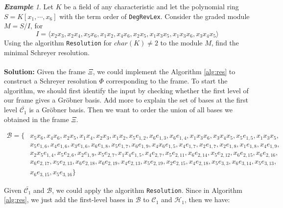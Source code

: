\documentclass{article}
\theoremstyle{definition}
\theoremstyle{remark}
\theoremstyle{example}
\newtheorem{example}{\textbf{Example}}[section]
\begin{document}
\begin{example}
    Let $K$ be a field of any characteristic and let the polynomial ring $S = K[x_1,\cdots,x_6]$ with the term order of \verb+DegRevLex+. Consider the graded module $M = S/I$, for 
    \begin{equation}
        I = \langle x_2x_3,x_2x_4,x_5x_6,x_1x_2,x_4x_6,x_2x_5,x_1x_3x_5,x_1x_3x_6,x_3x_4x_5\rangle
    \end{equation} 
    Using the algorithm \verb+Resolution+ for $char(K) \neq 2$ to the module $M$, find the minimal Schreyer resolution.
\end{example}

\paragraph{}

\textbf{Solution: }Given the frame $\Xi$, we could implement the Algorithm \ref{alg:res} to construct a Schreyer resolution $\Phi$ corresponding to the frame. To start the algorithm, we should first identify the input by checking whether the first level of our frame gives a Gröbner basis. \textcolor{BrickRed}{Add more to explain the set of bases at the first level $\bar{\mathcal{C}_1}$ is a Gröbner basis}. Then we want to order the union of all bases we obtained in the frame $\Xi$.

\begin{equation}
    \begin{aligned}
        \mathcal{B} = \{&x_5x_6,x_4x_6,x_2x_5,x_1x_4,x_2x_3,x_1x_2,x_5e_{1,2},x_6e_{1,3},x_6e_{1,4},x_1x_3x_6,x_3x_4x_5,x_5e_{1,5},x_1x_3x_5, \\
                    & x_5e_{1,6},x_4e_{1,6},x_3e_{1,6},x_6e_{1,8},x_5e_{1,7},x_6e_{1,9},x_4x_6e_{1,5},x_4e_{1,7},x_2e_{1,7},x_2e_{1,8},x_1e_{1,8},x_4e_{1,9},\\
                    & x_2x_5e_{1,4},x_5e_{2,6},x_2e_{1,9},x_5e_{2,7},x_1x_4e_{1,5},x_4e_{2,7},x_5e_{2,11},x_6e_{2,14},x_5e_{2,12},x_6e_{2,15},x_6e_{2,16},\\
                    & x_6e_{2,17},x_5e_{2,13},x_6e_{2,18}, x_6e_{2,19},x_4e_{2,13},x_5e_{2,19},x_2e_{2,15},x_4e_{2,18},x_5e_{3,3},x_6e_{3,14},x_5e_{3,13},\\
                    & x_6e_{3,15},x_5e_{3,16}\}
    \end{aligned}
\end{equation}

Given $\bar{\mathcal{C}_1}$ and $\mathcal{B}$, we could apply the algorithm \verb+Resolution+. Since in Algorithm \ref{alg:res}, we just add the first-level bases in $\mathcal{B}$ to $\mathcal{C}_1$ and $\mathcal{H}_1$, then we have:
\end{document}
